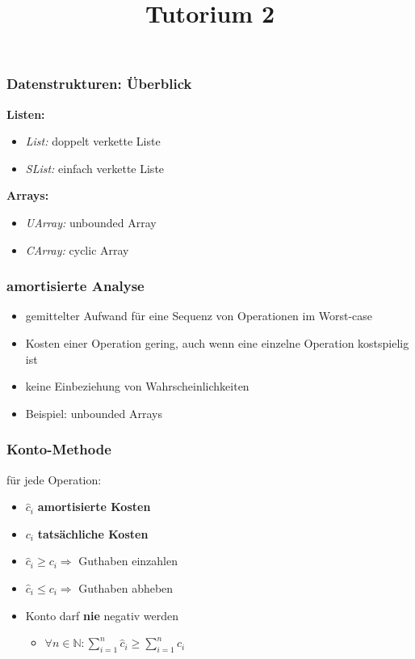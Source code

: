 
\title[Algorithmen I SS 14]{Tutorium 2}



\begin{frame}
  \maketitle
\end{frame}

\begin{frame}
	\frametitle{Datenstrukturen: Überblick}
	\textbf{Listen:}\\
	\begin{itemize}
		\item \textit{List:} doppelt verkette Liste
		\item \textit{SList:} einfach verkette Liste
	\end{itemize}

	\textbf{Arrays:}\\
	\begin{itemize}
		\item \textit{UArray:} unbounded Array
		\item \textit{CArray:} cyclic Array
	\end{itemize}
\end{frame}


\begin{frame}
	\frametitle{amortisierte Analyse}
	\begin{itemize}
		\item gemittelter Aufwand für eine Sequenz von Operationen im Worst-case
		\item Kosten einer Operation gering, auch wenn eine einzelne Operation kostspielig ist
		\item keine Einbeziehung von Wahrscheinlichkeiten
		\item Beispiel: unbounded Arrays 
	\end{itemize}
\end{frame}

\begin{frame}
	\frametitle{Konto-Methode}
	für jede Operation:
	\begin{itemize}
		\item $\hat{c}_i$ \textbf{amortisierte Kosten}
		\item $c_i$ \textbf{tatsächliche Kosten}
		\item $\hat{c}_i \geq c_i  \Rightarrow $  Guthaben einzahlen
		\item $\hat{c}_i \leq c_i  \Rightarrow $  Guthaben abheben
		\item Konto darf \textbf{nie} negativ werden
		\begin{itemize}
			\item $ \forall n \in \mathbb{N} : \sum_{i=1} ^n \hat{c}_i \geq \sum_{i=1} ^n c_i$
		\end{itemize}

	\end{itemize}

\end{frame}

